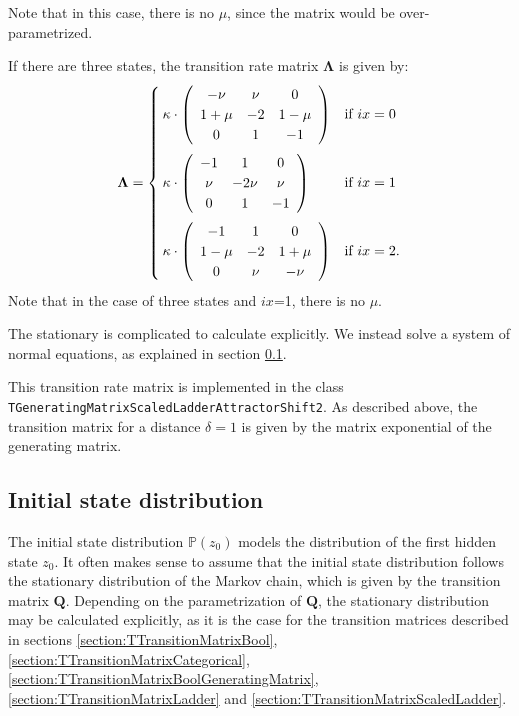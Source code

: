 \documentclass[a4paper,11pt]{article}
\def\Q{\boldsymbol{Q}}
\def\bLambda{\boldsymbol{\Lambda}}
\def\p{\mathbb{P}}
\newcommand{\class}[1]{\texttt{#1}}
\begin{document}
Note that in this case, there is no $\mu$, since the matrix would be over-parametrized.

If there are three states, the transition rate matrix $\bLambda$ is given by:
    \begin{equation*}
    \bLambda = \begin{cases}
    \kappa \cdot  \left(\begin{array}{ccc}
    -\nu & \nu & 0 \\
    1+\mu & -2 & 1-\mu \\
    0 & 1 & -1
    \end{array}\right)  & \mbox{if } ix = 0 \vspace{0.2cm}\\
    \kappa \cdot  \left(\begin{array}{ccc}
    -1 & 1 & 0 \\
    \nu & -2\nu & \nu \\
    0 & 1 & -1
    \end{array}\right)  & \mbox{if } ix = 1 \vspace{0.2cm}\\
    \kappa \cdot  \left(\begin{array}{ccc}
    -1 & 1 & 0 \\
    1-\mu & -2 & 1+\mu \\
    0 & \nu & -\nu
    \end{array}\right) & \mbox{if } ix = 2.
    \end{cases}
    \end{equation*}
Note that in the case of three states and $ix$=1, there is no $\mu$.

The stationary is complicated to calculate explicitly. We instead solve a system of normal equations, as explained in section \ref{section:InitialStateDistr}.


This transition rate matrix is implemented in the class \class{TGeneratingMatrixScaledLadderAttractorShift2}. As described above, the transition matrix for a distance $\delta = 1$ is given by the matrix exponential of the generating matrix.

\subsection{Initial state distribution}\label{section:InitialStateDistr}
The initial state distribution $\p(z_0)$ models the distribution of the first hidden state $z_0$. It often makes sense to assume that the initial state distribution follows the stationary distribution of the Markov chain, which is given by the transition matrix $\Q$.
Depending on the parametrization of $\Q$, the stationary distribution may be calculated explicitly, as it is the case for the transition matrices described in sections \ref{section:TTransitionMatrixBool}, \ref{section:TTransitionMatrixCategorical}, \ref{section:TTransitionMatrixBoolGeneratingMatrix}, \ref{section:TTransitionMatrixLadder} and \ref{section:TTransitionMatrixScaledLadder}.
\end{document}
